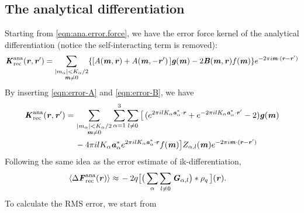 \documentclass[journal=jacsat,manuscript=article]{achemso}
\renewcommand{\v}[1]{\textbf{\textit{#1}}}
\begin{document}
\subsection{The analytical differentiation}
Starting from \ref{eqn:ana.error.force}, we have the error force kernel
of the analytical differentiation (notice the self-interacting term is removed):
\begin{align}
  \v K^{\textrm{ana}}_{\textrm{rec}}(\v r, \v r')
  =
  \sum_{
    \begin{subarray}{c}
      \vert m_{\alpha}\vert < K_\alpha/2\\
      \v m\neq 0
    \end{subarray}}
  \{
  [A(\v m, \v r) + A(\v m,-\v r')\,]
  \v g(\v m) -
  2\v B(\v m,\v r) f(\v m)
  \}
  e^{-2\pi i\v m\cdot(\v r-\v r')}
\end{align}
By inserting \ref{eqn:error-A} and \ref{eqn:error-B}, we have
\begin{align}\nonumber
  \v K^{\textrm{ana}}_{\textrm{rec}}(\v r, \v r')
  =\,&
  \sum_{
    \begin{subarray}{c}
      \vert m_{\alpha}\vert < K_\alpha/2\\
      \v m\neq 0
    \end{subarray}}
  \sum_{\alpha=1}^3\sum_{l\neq 0}
  \big[
  \,(
  e^{2\pi i l K_\alpha\v a^\ast_\alpha\cdot \v r} +
  e^{-2\pi i l K_\alpha\v a^\ast_\alpha\cdot \v r'}
  - 2
  )
  \v g(\v m)
  \\ 
  \,&
  - 4\pi i l K_\alpha\v a_\alpha^\ast e^{2\pi i l K_\alpha\v a^\ast_\alpha\cdot \v r}
  f(\v m)
  \big]
  Z_{\alpha,l}(\v m)
  e^{-2\pi i\v m\cdot(\v r-\v r')}  
\end{align}
Following  the same idea as the error estimate of  ik-differentiation,
\begin{align}
  \langle\Delta\v F^{\textrm{ana}}_{\textrm{rec}}(\v r)\rangle
  \approx\,&
  -2q
  \big[
  \big(
  \sum_{\alpha}\sum_{l\neq 0}\v G_{\alpha,l}
  \big)
  \ast\rho_q\,
  \big] (\v r).
\end{align}
To calculate the RMS error, we start from
\end{document}
